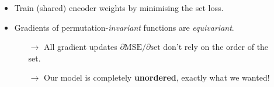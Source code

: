 \documentclass[a0paper, landscape, 25pt]{tikzposter}
\begin{document}
\begin{columns}
{            \vspace{1cm}
            \begin{center}
            \end{center}
            \vspace{1cm}
            \begin{center}
            \end{center}
            \vspace{1cm}
            \begin{itemize}
                \item Train (shared) encoder weights by minimising the \textcolor{colorThree!50!black}{set loss}.
                \item Gradients of permutation-\emph{invariant} functions are \emph{equivariant}.
                \begin{itemize}
                    \item[$\rightarrow$] All gradient updates \textcolor{colorTwo}{$\partial \text{MSE} / \partial \text{set}$}  don't rely on the order of the set.
                    \item[$\rightarrow$] Our model is completely \textbf{unordered}, exactly what we wanted!
                \end{itemize}

            \end{itemize}
        }






\end{columns}
\end{document}
